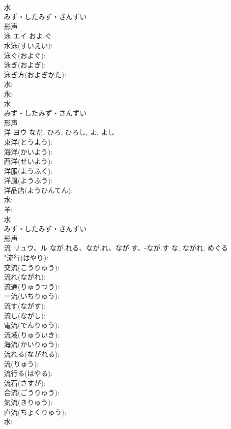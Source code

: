 \documentclass[8pt]{extreport}
\begin{document}
\begin{CJK}{UTF8}{min}
\\	水	
\\	みず・したみず・さんずい	
\\	形声 
\\	泳	エイ	およ.ぐ		
\\	水泳(すいえい): 
\\	泳ぐ(およぐ): 
\\	泳ぎ(およぎ): 
\\	泳ぎ方(およぎかた): 
\\	水: 
\\	永: 
\\	水	
\\	みず・したみず・さんずい	
\\	形声 
\\	洋	ヨウ		なだ, ひろ, ひろし, よ, よし	
\\	東洋(とうよう): 
\\	海洋(かいよう): 
\\	西洋(せいよう): 
\\	洋服(ようふく): 
\\	洋風(ようふう): 
\\	洋品店(ようひんてん): 
\\	水: 
\\	羊: 
\\	水	
\\	みず・したみず・さんずい	
\\	形声 
\\	流	リュウ、ル	なが.れる、なが.れ、なが.す、-なが.す	な, ながれ, めぐる	
\\	"流行(はやり): 
\\	交流(こうりゅう): 
\\	流れ(ながれ): 
\\	流通(りゅうつう): 
\\	一流(いちりゅう): 
\\	流す(ながす): 
\\	流し(ながし): 
\\	電流(でんりゅう): 
\\	流域(りゅういき): 
\\	海流(かいりゅう): 
\\	流れる(ながれる): 
\\	流(りゅう): 
\\	流行る(はやる): 
\\	流石(さすが): 
\\	合流(ごうりゅう): 
\\	気流(きりゅう): 
\\	直流(ちょくりゅう): 
\\	水: 

\end{CJK}
\end{document}
